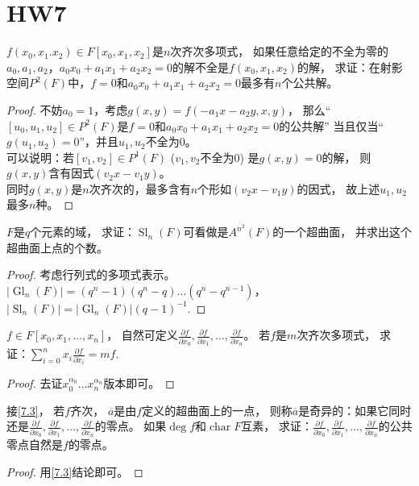 \section{HW7}
\begin{exercise}\label{7.1}
    $f(x_0,x_1.x_2)\in F[x_0,x_1,x_2]$是$n$次齐次多项式，
    如果任意给定的不全为零的$a_0,a_1,a_2$，$a_0x_0+a_1x_1+a_2x_2=0$的解不全是$f(x_0,x_1,x_2)$的解，
    求证：在射影空间$P^2(F)$中，$f=0$和$a_0x_0+a_1x_1+a_2x_2=0$最多有$n$个公共解。
\end{exercise}
\begin{proof}
    不妨$a_0=1$，考虑$g(x,y)=f(-a_1x-a_2y,x,y)$，
    那么``$[u_0,u_1,u_2]\in P^2(F)$是$f=0$和$a_0x_0+a_1x_1+a_2x_2=0$的公共解''
    当且仅当``$g(u_1,u_2)=0$''，并且$u_1,u_2$不全为$0$。\\
    可以说明：若$[v_1,v_2]\in P^1(F)$ ($v_1,v_2$不全为$0$) 是$g(x,y)=0$的解，
    则$g(x,y)$含有因式$(v_2x-v_1y)$。\\
    同时$g(x,y)$是$n$次齐次的，最多含有$n$个形如$(v_2x-v_1y)$的因式，
    故上述$u_1,u_2$最多$n$种。
\end{proof}

\begin{exercise}\label{7.2}
    $F$是$q$个元素的域，
    求证：$\operatorname{Sl}_n(F)$可看做是$A^{n^2}(F)$的一个超曲面，
    并求出这个超曲面上点的个数。
\end{exercise}
\begin{proof}
    考虑行列式的多项式表示。$|\operatorname{Gl}_n(F)|=(q^n-1)(q^n-q)\ldots(q^n-q^{n-1})$，
    $|\operatorname{Sl}_n(F)|=|\operatorname{Gl}_n(F)|(q-1)^{-1}$.
\end{proof}

\begin{exercise}\label{7.3}
    $f\in F[x_0,x_1,\ldots,x_n]$，
    自然可定义$\frac{\partial f}{\partial x_0},\frac{\partial f}{\partial x_1},\ldots,\frac{\partial f}{\partial x_n}$。
    若$f$是$m$次齐次多项式，
    求证：$\sum_{i=0}^n x_i \frac{\partial f}{\partial x_i}=mf$.
\end{exercise}
\begin{proof}
    去证$x_0^{\alpha_0}\ldots x_n^{\alpha_n}$版本即可。
\end{proof}

\begin{exercise}\label{7.4}
    接\ref{7.3}，
    若$f$齐次，
    $\overline{a}$是由$f$定义的超曲面上的一点，
    则称$\overline{a}$是奇异的：如果它同时还是$\frac{\partial f}{\partial x_0},\frac{\partial f}{\partial x_1},\ldots,\frac{\partial f}{\partial x_n}$的零点。
    如果$\deg f$和$\operatorname{char}F$互素，
    求证：$\frac{\partial f}{\partial x_0},\frac{\partial f}{\partial x_1},\ldots,\frac{\partial f}{\partial x_n}$的公共零点自然是$f$的零点。
\end{exercise}
\begin{proof}
    用\ref{7.3}结论即可。
\end{proof}

